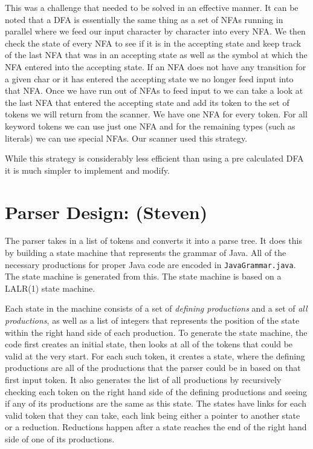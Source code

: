 \documentclass[12pt]{article}
\begin{document}
This was a challenge that needed to be solved in an effective manner. It can be noted that a DFA is
essentially the same thing as a set of NFAs running in parallel where we feed our input character by
character into every NFA. We then check the state of every NFA to see if it is in the accepting
state and keep track of the last NFA that was in an accepting state as well as the symbol at which
the NFA entered into the accepting state. If an NFA does not have any transition for a given char or
it has entered the accepting state we no longer feed input into that NFA. Once we have run out of
NFAs to feed input to we can take a look at the last NFA that entered the accepting state and add
its token to the set of tokens we will return from the scanner. We have one NFA for every token. For
all keyword tokens we can use just one NFA and for the remaining types (such as literals) we can use
special NFAs. Our scanner used this strategy.

While this strategy is considerably less efficient than using a pre calculated DFA it is much
simpler to implement and modify.


\section*{Parser Design: (Steven)}

The parser takes in a list of tokens and converts it into a parse tree.  It does this by building a
state machine that represents the grammar of Java.  All of the necessary productions for proper Java
code are encoded in \texttt{JavaGrammar.java}.  The state machine is generated from this.  The state
machine is based on a LALR(1) state machine.

Each state in the machine consists of a set of \textit{defining productions} and a set of
\textit{all productions}, as well as a list of integers that represents the position of the state
within the right hand side of each production. To generate the state machine, the code first creates
an initial state, then looks at all of the tokens that could be valid at the very start.  For each
such token, it creates a state, where the defining productions are all of the productions that the
parser could be in based on that first input token.  It also generates the list of all productions
by recursively checking each token on the right hand side of the defining productions and seeing if
any of its productions are the same as this state.  The states have links for each valid token that
they can take, each link being either a pointer to another state or a reduction.  Reductions happen
after a state reaches the end of the right hand side of one of its productions.
\end{document}

